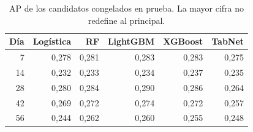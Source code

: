 \begin{table}[!htbp]\centering
\caption{AP de los candidatos congelados en prueba. La mayor cifra no redefine al principal.}\label{res:comparacion}
\begin{tabular}{rrrrrr}
\toprule
Día & Logística & RF & LightGBM & XGBoost & TabNet\\
\midrule
7 & 0,278 & 0,281 & 0,283 & 0,283 & 0,275\\
14 & 0,232 & 0,233 & 0,234 & 0,237 & 0,235\\
28 & 0,280 & 0,284 & 0,290 & 0,286 & 0,264\\
42 & 0,269 & 0,272 & 0,274 & 0,272 & 0,257\\
56 & 0,244 & 0,262 & 0,260 & 0,255 & 0,248\\
\bottomrule
\end{tabular}
\end{table}
